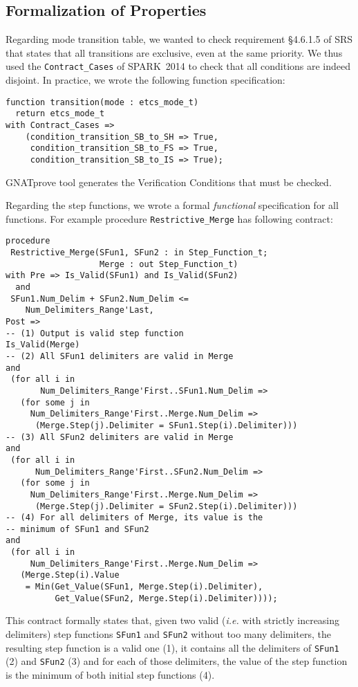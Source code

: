 \documentclass[10pt,a4paper,twocolumn]{article}
\newcommand{\gnatprove}{GNATprove\xspace}
\newcommand{\newspark}{SPARK~2014\xspace}
\newcommand{\ie}{\textit{i.e.}\xspace}
\newcommand{\SPARK}[1]{\lstinline[language=Ada,basicstyle={\footnotesize
      \sffamily},framesep=0pt]$#1$}
\begin{document}
\subsection{Formalization of Properties}

Regarding mode transition table, we wanted to check requirement
§4.6.1.5 of SRS that states that all transitions are exclusive, even
at the same priority. We thus used the \SPARK{Contract_Cases} of
\newspark to check that all conditions are indeed disjoint. In
practice, we wrote the following function specification:

\begin{lstlisting}
function transition(mode : etcs_mode_t)
  return etcs_mode_t
with Contract_Cases =>
    (condition_transition_SB_to_SH => True,
     condition_transition_SB_to_FS => True,
     condition_transition_SB_to_IS => True);
\end{lstlisting}

\gnatprove tool generates the Verification Conditions that must be
checked.

Regarding the step functions, we wrote a formal \emph{functional}
specification for all functions. For example procedure
\SPARK{Restrictive_Merge} has following contract:

\begin{lstlisting}
procedure
 Restrictive_Merge(SFun1, SFun2 : in Step_Function_t;
                   Merge : out Step_Function_t)
with Pre => Is_Valid(SFun1) and Is_Valid(SFun2)
  and
 SFun1.Num_Delim + SFun2.Num_Delim <=
    Num_Delimiters_Range'Last,
Post =>
-- (1) Output is valid step function
Is_Valid(Merge)
-- (2) All SFun1 delimiters are valid in Merge
and
 (for all i in
       Num_Delimiters_Range'First..SFun1.Num_Delim =>
   (for some j in
     Num_Delimiters_Range'First..Merge.Num_Delim =>
      (Merge.Step(j).Delimiter = SFun1.Step(i).Delimiter)))
-- (3) All SFun2 delimiters are valid in Merge
and
 (for all i in
      Num_Delimiters_Range'First..SFun2.Num_Delim =>
   (for some j in
     Num_Delimiters_Range'First..Merge.Num_Delim =>
      (Merge.Step(j).Delimiter = SFun2.Step(i).Delimiter)))
-- (4) For all delimiters of Merge, its value is the
-- minimum of SFun1 and SFun2
and
 (for all i in
     Num_Delimiters_Range'First..Merge.Num_Delim =>
   (Merge.Step(i).Value
    = Min(Get_Value(SFun1, Merge.Step(i).Delimiter),
          Get_Value(SFun2, Merge.Step(i).Delimiter))));
\end{lstlisting}

This contract formally states that, given two valid (\ie with strictly
increasing delimiters) step functions \SPARK{SFun1} and \SPARK{SFun2}
without too many delimiters, the resulting step function is a valid
one (1), it contains all the delimiters of \SPARK{SFun1} (2) and
\SPARK{SFun2} (3) and for each of those delimiters, the value of the
step function is the minimum of both initial step functions (4).
\end{document}
